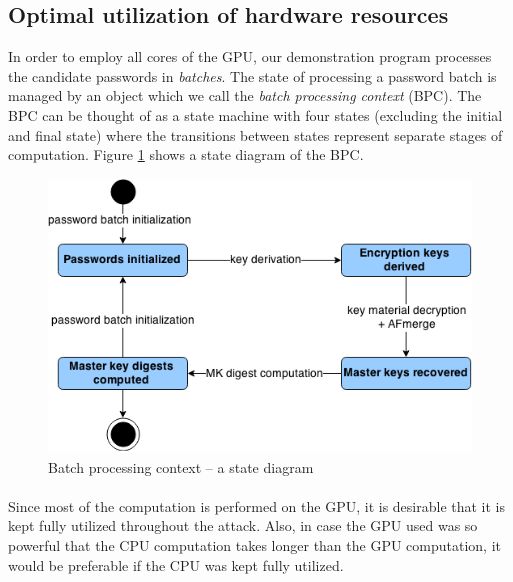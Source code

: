 \documentclass[12pt,oneside]{fithesis2}
\begin{document}
      \subsection{Optimal utilization of hardware resources}
      In order to employ all cores of the GPU, our demonstration program processes the candidate passwords in \emph{batches}. The state of processing a password batch is managed by an object which we call the \emph{batch processing context} (BPC). The BPC can be thought of as a state machine with four states (excluding the initial and final state) where the transitions between states represent separate stages of computation. Figure \ref{fig:processingContext} shows a state diagram of the BPC.
      
      \begin{figure}[t]
        \centering
        \includegraphics[width=\linewidth]{images/bpc.png}
        \caption{Batch processing context -- a state diagram}
        \label{fig:processingContext}
      \end{figure}
      
      
      \paragraph*{}
      Since most of the computation is performed on the GPU, it is desirable that it is kept fully utilized throughout the attack. Also, in case the GPU used was so powerful that the CPU computation takes longer than the GPU computation, it would be preferable if the CPU was kept fully utilized.
      
\end{document}
